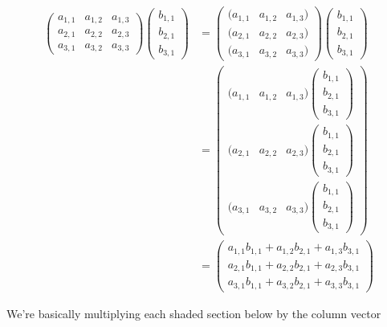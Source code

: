 \documentclass{ximera}
\begin{document}
\begin{align*}
\begin{pmatrix}
  a_{1,1} & a_{1,2} & a_{1,3} \\
  a_{2,1} & a_{2,2} & a_{2,3} \\
  a_{3,1} & a_{3,2} & a_{3,3}
\end{pmatrix}
\begin{pmatrix} b_{1,1} \\ b_{2,1} \\ b_{3,1} \end{pmatrix}
&=
\begin{pmatrix}
  (a_{1,1} & a_{1,2} & a_{1,3}) \\
  (a_{2,1} & a_{2,2} & a_{2,3}) \\
  (a_{3,1} & a_{3,2} & a_{3,3})
\end{pmatrix}
\begin{pmatrix} b_{1,1} \\ b_{2,1} \\ b_{3,1} \end{pmatrix}\\
&=
\begin{pmatrix}
  (a_{1,1} & a_{1,2} & a_{1,3}) \begin{pmatrix} b_{1,1} \\ b_{2,1} \\ b_{3,1} \end{pmatrix}\\
  (a_{2,1} & a_{2,2} & a_{2,3}) \begin{pmatrix} b_{1,1} \\ b_{2,1} \\ b_{3,1} \end{pmatrix}\\
  (a_{3,1} & a_{3,2} & a_{3,3}) \begin{pmatrix} b_{1,1} \\ b_{2,1} \\ b_{3,1} \end{pmatrix}
\end{pmatrix}\\
&=
\begin{pmatrix}
  a_{1,1}b_{1,1} + a_{1,2}b_{2,1} + a_{1,3}b_{3,1}  \\
  a_{2,1}b_{1,1} + a_{2,2}b_{2,1} + a_{2,3}b_{3,1}  \\
  a_{3,1}b_{1,1} + a_{3,2}b_{2,1} + a_{3,3}b_{3,1}
\end{pmatrix}
\end{align*}

We're basically multiplying each shaded section below by the column vector
\end{document}
